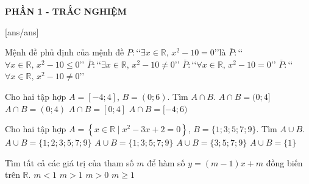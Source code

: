 
\begin{center}
	\textbf{PHẦN 1 - TRẮC NGHIỆM}
\end{center}
[ans/ans]
\begin{ex}%
Mệnh đề phủ định của mệnh đề $P\colon$\lq\lq$\exists x\in\mathbb{R},\,x^2-10=0$\rq\rq là
		\choice
	{$\overline{P}\colon$\lq\lq$\forall x \in\mathbb{R},\,x^2-10 \leq 0$\rq\rq}
	{$\overline{P}\colon$\lq\lq$\exists x \in\mathbb{R},\,x^2-10 \neq 0$\rq\rq}
	{$\overline{P}\colon$\lq\lq$\forall x \in\mathbb{R},\,x^2-10=0$\rq\rq}
	{\True $\overline{P}\colon$\lq\lq$\forall x\in \mathbb{R},\, x^2-10\neq 0$\rq\rq}
\end{ex}

\begin{ex}%
Cho hai tập hợp $A=[-4;4]$, $B=(0;6)$. Tìm $A\cap B$.
		\choice
	{\True $A\cap B=(0;4]$}
	{$A\cap B=(0;4)$}
	{$A\cap B=[0;4]$}
	{$A\cap B=[-4;6)$}
		\loigiai{
Ta thấy $A\cap B=(0;4]$.
}
\end{ex}

\begin{ex}%
Cho hai tập hợp $A=\left\{x\in\mathbb{R}\mid x^2-3x+2=0\right\}$, $B=\{1;3;5;7;9\}$. Tìm $A\cup B$.
		\choice
	{\True $A\cup B=\{1;2;3;5;7;9\}$}
	{$A\cup B=\{1;3;5;7;9\}$}
	{$A\cup B=\{3;5;7;9\}$}
	{$A\cup B=\{1\}$}
\end{ex}

\begin{ex}%
Tìm tất cả các giá trị của tham số $m$ để hàm số $y=(m-1)x+m$ đồng biến trên $\mathbb{R}$.
		\choice
	{$m<1$}
	{\True $m>1$}
	{$m>0$}
	{$m\geq 1$}
\end{ex}

